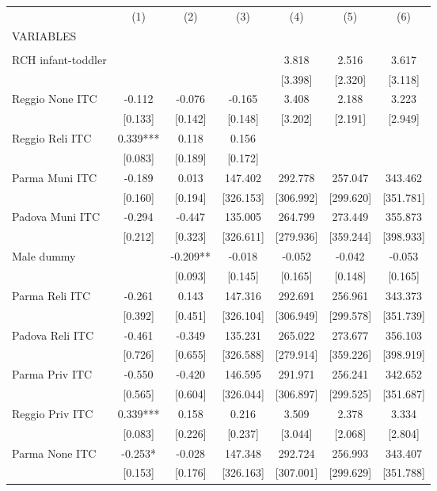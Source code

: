 \begin{tabular}{lcccccc} \hline
 & (1) & (2) & (3) & (4) & (5) & (6) \\
VARIABLES &  &  &  &  &  &  \\ \hline
 &  &  &  &  &  &  \\
RCH infant-toddler &  &  &  & 3.818 & 2.516 & 3.617 \\
 &  &  &  & [3.398] & [2.320] & [3.118] \\
Reggio None ITC & -0.112 & -0.076 & -0.165 & 3.408 & 2.188 & 3.223 \\
 & [0.133] & [0.142] & [0.148] & [3.202] & [2.191] & [2.949] \\
Reggio Reli ITC & 0.339*** & 0.118 & 0.156 &  &  &  \\
 & [0.083] & [0.189] & [0.172] &  &  &  \\
Parma Muni ITC & -0.189 & 0.013 & 147.402 & 292.778 & 257.047 & 343.462 \\
 & [0.160] & [0.194] & [326.153] & [306.992] & [299.620] & [351.781] \\
Padova Muni ITC & -0.294 & -0.447 & 135.005 & 264.799 & 273.449 & 355.873 \\
 & [0.212] & [0.323] & [326.611] & [279.936] & [359.244] & [398.933] \\
Male dummy &  & -0.209** & -0.018 & -0.052 & -0.042 & -0.053 \\
 &  & [0.093] & [0.145] & [0.165] & [0.148] & [0.165] \\
Parma Reli ITC & -0.261 & 0.143 & 147.316 & 292.691 & 256.961 & 343.373 \\
 & [0.392] & [0.451] & [326.104] & [306.949] & [299.578] & [351.739] \\
Padova Reli ITC & -0.461 & -0.349 & 135.231 & 265.022 & 273.677 & 356.103 \\
 & [0.726] & [0.655] & [326.588] & [279.914] & [359.226] & [398.919] \\
Parma Priv ITC & -0.550 & -0.420 & 146.595 & 291.971 & 256.241 & 342.652 \\
 & [0.565] & [0.604] & [326.044] & [306.897] & [299.525] & [351.687] \\
Reggio Priv ITC & 0.339*** & 0.158 & 0.216 & 3.509 & 2.378 & 3.334 \\
 & [0.083] & [0.226] & [0.237] & [3.044] & [2.068] & [2.804] \\
Parma None ITC & -0.253* & -0.028 & 147.348 & 292.724 & 256.993 & 343.407 \\
 & [0.153] & [0.176] & [326.163] & [307.001] & [299.629] & [351.788] \\

\end{tabular}
